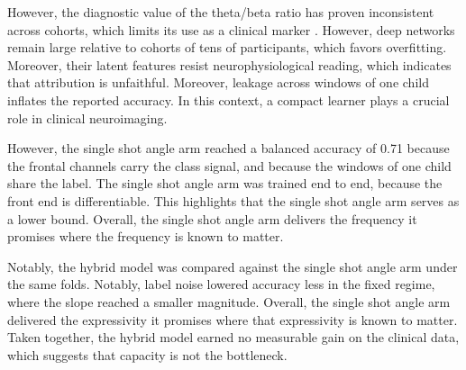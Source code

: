 However, the diagnostic value of the theta/beta ratio has proven inconsistent across cohorts, which limits its use as a clinical marker \cite{arns2013}. However, deep networks remain large relative to cohorts of tens of participants, which favors overfitting. Moreover, their latent features resist neurophysiological reading, which indicates that attribution is unfaithful. Moreover, leakage across windows of one child inflates the reported accuracy. In this context, a compact learner plays a crucial role in clinical neuroimaging.

However, the single shot angle arm reached a balanced accuracy of 0.71 because the frontal channels carry the class signal, and because the windows of one child share the label. The single shot angle arm was trained end to end, because the front end is differentiable. This highlights that the single shot angle arm serves as a lower bound. Overall, the single shot angle arm delivers the frequency it promises where the frequency is known to matter.

Notably, the hybrid model was compared against the single shot angle arm under the same folds. Notably, label noise lowered accuracy less in the fixed regime, where the slope reached a smaller magnitude. Overall, the single shot angle arm delivered the expressivity it promises where that expressivity is known to matter. Taken together, the hybrid model earned no measurable gain on the clinical data, which suggests that capacity is not the bottleneck.
